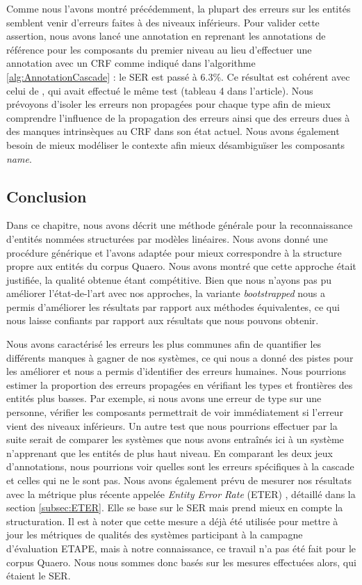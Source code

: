 \documentclass[12pt,a4paper,times,twoside,openright]{report}
\begin{document}
Comme nous l'avons montré précédemment, la plupart des erreurs sur les entités semblent venir d'erreurs faites à des niveaux inférieurs. Pour valider cette assertion, nous avons lancé une annotation en reprenant les annotations de référence pour les composants du premier niveau au lieu d'effectuer une annotation avec un CRF comme indiqué dans l'algorithme \ref{alg:AnnotationCascade} : le SER est passé à 6.3\%. Ce résultat est cohérent avec celui de \citet{Dinarelli2011}, qui avait effectué le même test (tableau 4 dans l'article). Nous prévoyons d'isoler les erreurs non propagées pour chaque type afin de mieux comprendre l'influence de la propagation des erreurs ainsi que des erreurs dues à des manques intrinsèques au CRF dans son état actuel. Nous avons également besoin de mieux modéliser le contexte afin mieux désambiguïser les composants \emph{name}.


        
    \subsection{Conclusion}
    \label{sec:cascade-conclusion}
Dans ce chapitre, nous avons décrit une méthode générale pour la reconnaissance d'entités nommées structurées par modèles linéaires. Nous avons donné une procédure générique et l'avons adaptée pour mieux correspondre à la structure propre aux entités du corpus Quaero. Nous avons montré que cette approche était justifiée, la qualité obtenue étant compétitive. Bien que nous n'ayons pas pu améliorer l'état-de-l'art avec nos approches, la variante \emph{bootstrapped} nous a permis d'améliorer les résultats par rapport aux méthodes équivalentes, ce qui nous laisse confiants par rapport aux résultats que nous pouvons obtenir.

Nous avons caractérisé les erreurs les plus communes afin de quantifier les différents manques à gagner de nos systèmes, ce qui nous a donné des pistes pour les améliorer et nous a permis d'identifier des erreurs humaines. Nous pourrions estimer la proportion des erreurs propagées en vérifiant les types et frontières des entités plus basses. Par exemple, si nous avons une erreur de type sur une personne, vérifier les composants permettrait de voir immédiatement si l'erreur vient des niveaux inférieurs. Un autre test que nous pourrions effectuer par la suite serait de comparer les systèmes que nous avons entraînés ici à un système n'apprenant que les entités de plus haut niveau. En comparant les deux jeux d'annotations, nous pourrions voir quelles sont les erreurs spécifiques à la cascade et celles qui ne le sont pas. Nous avons également prévu de mesurer nos résultats avec la métrique plus récente appelée \textit{Entity Error Rate} (ETER) \citep{jannet2014eter}, détaillé dans la section \ref{subsec:ETER}. Elle se base sur le SER mais prend mieux en compte la structuration. Il est à noter que cette mesure a déjà été utilisée pour mettre à jour les métriques de qualités des systèmes participant à la campagne d'évaluation ETAPE, mais à notre connaissance, ce travail n'a pas été fait pour le corpus Quaero. Nous nous sommes donc basés sur les mesures effectuées alors, qui étaient le SER.
\end{document}
